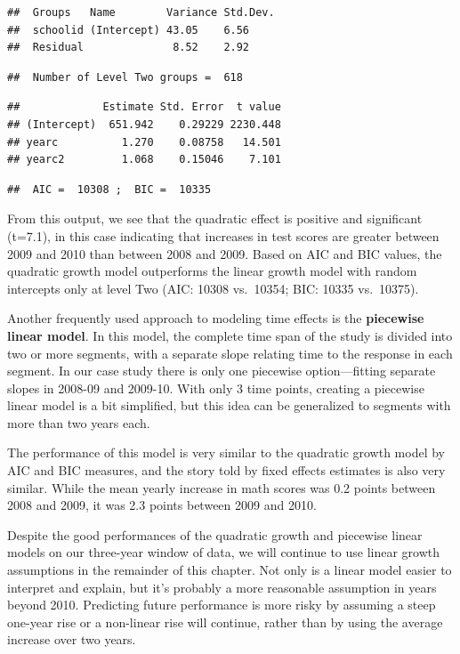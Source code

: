 \documentclass[
]{krantz}
\begin{document}
\begin{verbatim}
##  Groups   Name        Variance Std.Dev.
##  schoolid (Intercept) 43.05    6.56    
##  Residual              8.52    2.92
\end{verbatim}

\begin{verbatim}
##  Number of Level Two groups =  618
\end{verbatim}

\begin{verbatim}
##             Estimate Std. Error  t value
## (Intercept)  651.942    0.29229 2230.448
## yearc          1.270    0.08758   14.501
## yearc2         1.068    0.15046    7.101
\end{verbatim}

\begin{verbatim}
##  AIC =  10308 ;  BIC =  10335
\end{verbatim}

From this output, we see that the quadratic effect is positive and significant (t=7.1), in this case indicating that increases in test scores are greater between 2009 and 2010 than between 2008 and 2009. Based on AIC and BIC values, the quadratic growth model outperforms the linear growth model with random intercepts only at level Two (AIC: 10308 vs.~10354; BIC: 10335 vs.~10375).

Another frequently used approach to modeling time effects is the \textbf{piecewise linear model}. In this model, the complete time span of the study is divided into two or more segments, with a separate slope relating time to the response in each segment. In our case study there is only one piecewise option---fitting separate slopes in 2008-09 and 2009-10. With only 3 time points, creating a piecewise linear model is a bit simplified, but this idea can be generalized to segments with more than two years each.

The performance of this model is very similar to the quadratic growth model by AIC and BIC measures, and the story told by fixed effects estimates is also very similar. While the mean yearly increase in math scores was 0.2 points between 2008 and 2009, it was 2.3 points between 2009 and 2010.

Despite the good performances of the quadratic growth and piecewise linear models on our three-year window of data, we will continue to use linear growth assumptions in the remainder of this chapter. Not only is a linear model easier to interpret and explain, but it's probably a more reasonable assumption in years beyond 2010. Predicting future performance is more risky by assuming a steep one-year rise or a non-linear rise will continue, rather than by using the average increase over two years.
\end{document}

